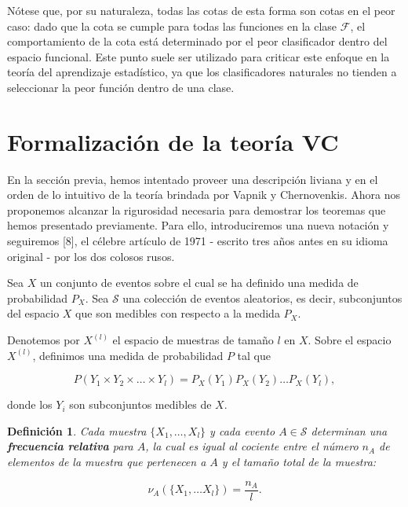 \documentclass{article}
\newtheorem{dfn}{Definición}[subsection]
\begin{document}
Nótese que, por su naturaleza, todas las cotas de esta forma son cotas en el peor caso: dado que 
la cota se cumple para todas las funciones en la clase \(\mathcal{F}\), el comportamiento de la cota 
está determinado por el peor clasificador dentro del espacio funcional. Este punto suele ser 
utilizado para criticar este enfoque en la teoría del aprendizaje estadístico, ya que los clasificadores 
naturales no tienden a seleccionar la peor función dentro de una clase.\newline


\section{Formalización de la teoría VC}

En la sección previa, hemos intentado proveer una descripción liviana y en el orden de lo intuitivo de la teoría brindada por 
Vapnik y Chernovenkis. Ahora nos proponemos alcanzar la rigurosidad necesaria para demostrar los teoremas que hemos presentado 
previamente. Para ello, introduciremos una nueva notación y seguiremos [8], el célebre artículo de 1971 - escrito tres años antes en su 
idioma original - por los dos colosos rusos.\newline


Sea \( X \) un conjunto de eventos sobre el cual se ha definido una medida de probabilidad \( P_X \). Sea \( \mathcal{S} \) una colección de eventos 
aleatorios, es decir, subconjuntos del espacio \( X \) que son medibles con respecto 
a la medida \( P_X \). \newline

Denotemos por \( X^{(l)} \) el espacio de muestras de tamaño \( l \) en \( X \). 
Sobre el espacio \( X^{(l)} \), definimos una medida de probabilidad \( P \) tal que

\[
P(Y_1\times Y_2 \times\dots\times Y_l) = P_X(Y_1) P_X(Y_2) \dots P_X(Y_l),
\]

donde los \( Y_i \) son subconjuntos medibles de \( X \).\newline

\begin{dfn}
Cada muestra \( \{X_1, \dots, X_l\} \) y cada evento \( A \in \mathcal{S} \) determinan 
una \textbf{frecuencia relativa} para \( A \), la cual es igual al cociente entre 
el número \( n_A \) de elementos de la muestra que pertenecen a \( A \) y el tamaño 
total de la muestra:

\[
\nu_A(\{X_1,\dots X_l\}) = \frac{n_A}{l}.
\]

\end{dfn}
\end{document}
